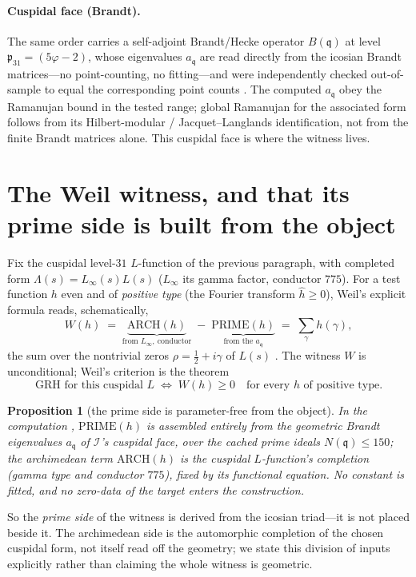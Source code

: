 \documentclass[11pt]{article}
\newtheorem{proposition}[theorem]{Proposition}
\theoremstyle{definition}
\newcommand{\Icos}{\mathcal{I}}
\newcommand{\fq}{\mathfrak{q}}
\begin{document}
\paragraph{Cuspidal face (Brandt).} The same order carries a self-adjoint Brandt/Hecke
operator $B(\fq)$ at level $\mathfrak p_{31}=(5\varphi-2)$, whose eigenvalues $a_\fq$ are
read directly from the icosian Brandt matrices---no point-counting, no fitting---and were
independently checked out-of-sample to equal the corresponding point counts
\cite{BrandtCuspidal}. The computed $a_\fq$ obey the Ramanujan bound in the tested range;
global Ramanujan for the associated form follows from its Hilbert-modular /
Jacquet--Langlands identification, not from the finite Brandt matrices alone. This
cuspidal face is where the witness lives.

\section{The Weil witness, and that its prime side is built from the object}
Fix the cuspidal level-$31$ $L$-function of the previous paragraph, with completed form
$\Lambda(s)=L_\infty(s)L(s)$ ($L_\infty$ its gamma factor, conductor $775$). For a test
function $h$ even and of \emph{positive type} (the Fourier transform $\widehat h\ge0$),
Weil's explicit formula reads, schematically,
\[
   W(h)\;=\;\underbrace{\mathrm{ARCH}(h)}_{\text{from }L_\infty,\ \text{conductor}}
   \;-\;\underbrace{\mathrm{PRIME}(h)}_{\text{from the }a_\fq}
   \;=\;\sum_{\gamma} h(\gamma),
\]
the sum over the nontrivial zeros $\rho=\tfrac12+i\gamma$ of $L(s)$ \cite{Weil}. The
witness $W$ is unconditional; Weil's criterion is the theorem
\[
   \text{GRH for this cuspidal } L \;\Longleftrightarrow\; W(h)\ge 0
   \quad\text{for every } h \text{ of positive type.}
\]

\begin{proposition}[the prime side is parameter-free from the object]\label{prop:witness}
In the computation \cite{BrandtCuspidal}, $\mathrm{PRIME}(h)$ is assembled entirely from
the geometric Brandt eigenvalues $a_\fq$ of $\Icos$'s cuspidal face, over the cached
prime ideals $N(\fq)\le 150$; the archimedean term $\mathrm{ARCH}(h)$ is the cuspidal
$L$-function's completion (gamma type and conductor $775$), fixed by its functional
equation. No constant is fitted, and no zero-data of the target enters the construction.
\end{proposition}

So the \emph{prime side} of the witness is derived from the icosian triad---it is not
placed beside it. The archimedean side is the automorphic completion of the chosen
cuspidal form, not itself read off the geometry; we state this division of inputs
explicitly rather than claiming the whole witness is geometric.
\end{document}
